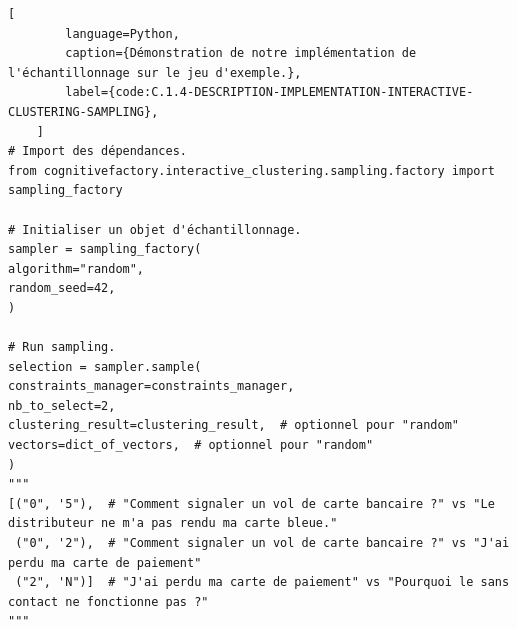 	\begin{lstlisting}[
		language=Python,
		caption={Démonstration de notre implémentation de l'échantillonnage sur le jeu d'exemple.},
		label={code:C.1.4-DESCRIPTION-IMPLEMENTATION-INTERACTIVE-CLUSTERING-SAMPLING},
	]
# Import des dépendances.
from cognitivefactory.interactive_clustering.sampling.factory import sampling_factory

# Initialiser un objet d'échantillonnage.
sampler = sampling_factory(
algorithm="random",
random_seed=42,
)

# Run sampling.
selection = sampler.sample(
constraints_manager=constraints_manager,
nb_to_select=2,
clustering_result=clustering_result,  # optionnel pour "random"
vectors=dict_of_vectors,  # optionnel pour "random"
)
"""
[("0", '5"),  # "Comment signaler un vol de carte bancaire ?" vs "Le distributeur ne m'a pas rendu ma carte bleue."
 ("0", '2"),  # "Comment signaler un vol de carte bancaire ?" vs "J'ai perdu ma carte de paiement"
 ("2", 'N")]  # "J'ai perdu ma carte de paiement" vs "Pourquoi le sans contact ne fonctionne pas ?"
"""
	\end{lstlisting}